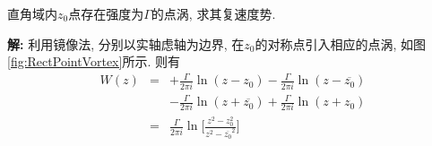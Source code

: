 \begin{problem}[问题6.5]
直角域内$z_0$点存在强度为$\Gamma$的点涡, 求其复速度势.
\end{problem}

\begin{solution}
\begin{multicols}{2}
\textbf{解:} 利用镜像法, 分别以实轴虑轴为边界, 在$z_0$的对称点引入相应的点涡, 如图\ref{fig:RectPointVortex}所示. 则有
\begin{eqnarray}
W(z) &=& +\frac{\Gamma}{2\pi i}\ln(z-z_0) -\frac{\Gamma}{2\pi i}\ln(z-\overline{z_0})\nonumber\\
     & & -\frac{\Gamma}{2\pi i}\ln(z+\overline{z_0})+\frac{\Gamma}{2\pi i}\ln(z+z_0)\nonumber\\
     &=& \frac{\Gamma}{2\pi i}\ln\Big[\frac{z^2-z_0^2}{z^2-\overline{z_0}^2}\Big]\nonumber
\end{eqnarray}

\vspace{0.1em}
\begin{center}

\label{fig:RectPointVortex}
\end{center}
\end{multicols}
\end{solution} 
